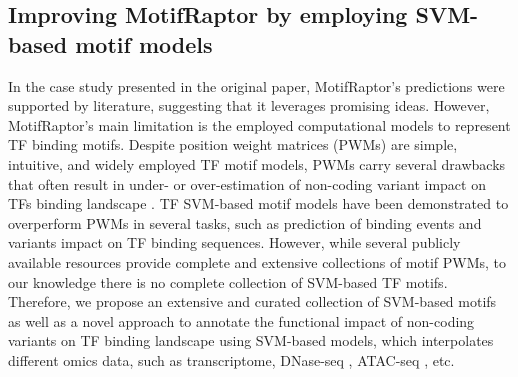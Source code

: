 \documentclass[a4paper, titlepage, openright]{book}
\newcommand{\motifraptor}{MotifRaptor\xspace}
\begin{document}
\subsection{Improving MotifRaptor by employing SVM-based motif models}
In the case study presented in the original paper, \motifraptor's predictions were supported by literature, suggesting that it leverages promising ideas. However, \motifraptor’s main limitation is the employed computational models to represent TF binding motifs. Despite position weight matrices \citep{stormo2000dna} (PWMs) are simple, intuitive, and widely employed TF motif models, PWMs carry several drawbacks that often result in under- or over-estimation of non-coding variant impact on TFs binding landscape \citep{tognon2023survey}. TF SVM-based motif models \citep{tognon2023survey, boeva2016analysis} have been demonstrated to overperform PWMs in several tasks, such as prediction of binding events and variants impact on TF binding sequences. However, while several publicly available resources provide complete and extensive collections of motif PWMs, to our knowledge there is no complete collection of SVM-based TF motifs. Therefore, we propose an extensive and curated collection of SVM-based motifs as well as a novel approach to annotate the functional impact of non-coding variants on TF binding landscape using SVM-based models, which interpolates different omics data, such as transcriptome, DNase-seq \citep{john2011chromatin}, ATAC-seq \citep{buenrostro2013transposition}, etc. 
\end{document}
